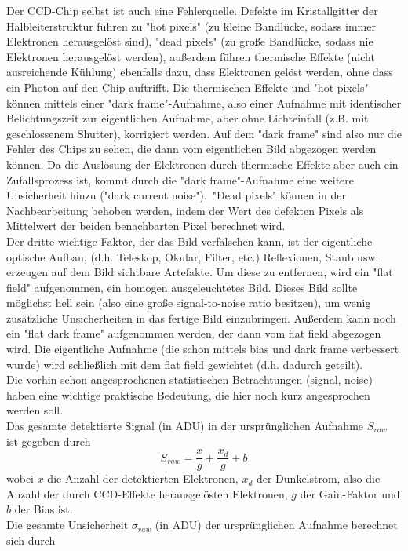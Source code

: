 Der CCD-Chip selbst ist auch eine Fehlerquelle. Defekte im Kristallgitter der Halbleiterstruktur führen zu "hot pixels" (zu kleine Bandlücke, sodass immer Elektronen herausgelöst sind), "dead pixels" (zu große Bandlücke, sodass nie Elektronen herausgelöst werden), außerdem führen thermische Effekte (nicht ausreichende Kühlung) ebenfalls dazu, dass Elektronen gelöst werden, ohne dass ein Photon auf den Chip auftrifft. Die thermischen Effekte und "hot pixels" können mittels einer "dark frame"-Aufnahme, also einer Aufnahme mit identischer Belichtungszeit zur eigentlichen Aufnahme, aber ohne Lichteinfall (z.B. mit geschlossenem Shutter), korrigiert werden. Auf dem "dark frame" sind also nur die Fehler des Chips zu sehen, die dann vom eigentlichen Bild abgezogen werden können. Da die Auslösung der Elektronen durch thermische Effekte aber auch ein Zufallsprozess ist, kommt durch die "dark frame"-Aufnahme eine weitere Unsicherheit hinzu ("dark current noise").\
"Dead pixels" können in der Nachbearbeitung behoben werden, indem der Wert des defekten Pixels als Mittelwert der beiden benachbarten Pixel berechnet wird.
\\
Der dritte wichtige Faktor, der das Bild verfälschen kann, ist der eigentliche optische Aufbau, (d.h. Teleskop, Okular, Filter, etc.) Reflexionen, Staub usw. erzeugen auf dem Bild sichtbare Artefakte. Um diese zu entfernen, wird ein "flat field" aufgenommen, ein homogen ausgeleuchtetes Bild. Dieses Bild sollte möglichst hell sein (also eine große signal-to-noise ratio besitzen), um wenig zusätzliche Unsicherheiten in das fertige Bild einzubringen. Außerdem kann noch ein "flat dark frame" aufgenommen werden, der dann vom flat field abgezogen wird. Die eigentliche Aufnahme (die schon mittels bias und dark frame verbessert wurde) wird schließlich mit dem flat field gewichtet (d.h. dadurch geteilt).
\\
Die vorhin schon angesprochenen statistischen Betrachtungen (signal, noise) haben eine wichtige praktische Bedeutung, die hier noch kurz angesprochen werden soll.
\\
Das gesamte detektierte Signal (in ADU) in der ursprünglichen Aufnahme $S_{raw}$ ist gegeben durch
\begin{equation}
S_{raw} = \frac{x}{g} + \frac{x_d}{g} + b
\end{equation}
wobei $x$ die Anzahl der detektierten Elektronen, $x_d$ der Dunkelstrom, also die Anzahl der durch CCD-Effekte herausgelösten Elektronen, $g$ der Gain-Faktor und $b$ der Bias ist.
\\
Die gesamte Unsicherheit $\sigma_{raw}$ (in ADU) der ursprünglichen Aufnahme berechnet sich durch 
